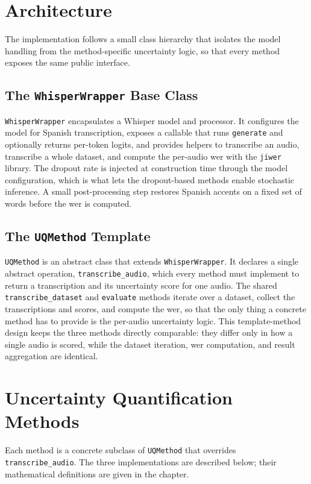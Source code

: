 \section{Architecture}

The implementation follows a small class hierarchy that isolates the model handling from the method-specific uncertainty logic, so that every method exposes the same public interface.

\subsection{The \texttt{WhisperWrapper} Base Class}
\texttt{WhisperWrapper} encapsulates a Whisper model and processor. It configures the model for Spanish transcription, exposes a callable that runs \texttt{generate} and optionally returns per-token logits, and provides helpers to transcribe an audio, transcribe a whole dataset, and compute the per-audio \acrshort{wer} with the \texttt{jiwer} library. The dropout rate is injected at construction time through the model configuration, which is what lets the dropout-based methods enable stochastic inference. A small post-processing step restores Spanish accents on a fixed set of words before the \acrshort{wer} is computed.

\subsection{The \texttt{UQMethod} Template}
\texttt{UQMethod} is an abstract class that extends \texttt{WhisperWrapper}. It declares a single abstract operation, \texttt{transcribe\_audio}, which every method must implement to return a transcription and its uncertainty score for one audio. The shared \texttt{transcribe\_dataset} and \texttt{evaluate} methods iterate over a dataset, collect the transcriptions and scores, and compute the \acrshort{wer}, so that the only thing a concrete method has to provide is the per-audio uncertainty logic. This template-method design keeps the three methods directly comparable: they differ only in how a single audio is scored, while the dataset iteration, \acrshort{wer} computation, and result aggregation are identical.

\section{Uncertainty Quantification Methods}

Each method is a concrete subclass of \texttt{UQMethod} that overrides \texttt{transcribe\_audio}. The three implementations are described below; their mathematical definitions are given in the  chapter.

